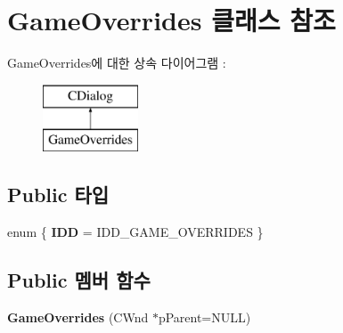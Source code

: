 \hypertarget{class_game_overrides}{}\section{Game\+Overrides 클래스 참조}
\label{class_game_overrides}
Game\+Overrides에 대한 상속 다이어그램 \+: \begin{figure}[H]
\begin{center}
\leavevmode
\includegraphics[height=2.000000cm]{class_game_overrides}
\end{center}
\end{figure}
\subsection*{Public 타입}
\begin{DoxyCompactItemize}
\item 
\mbox{\label{class_game_overrides_a0da33253aeb47bae8ed674bc210f2b12}} 
enum \{ {\bfseries I\+DD} = I\+D\+D\+\_\+\+G\+A\+M\+E\+\_\+\+O\+V\+E\+R\+R\+I\+D\+ES
 \}
\end{DoxyCompactItemize}
\subsection*{Public 멤버 함수}
\begin{DoxyCompactItemize}
\item 
\mbox{\label{class_game_overrides_affe74cfac71b81010d1ad7ce555d9853}} 
{\bfseries Game\+Overrides} (C\+Wnd $\ast$p\+Parent=N\+U\+LL)
\end{DoxyCompactItemize}
